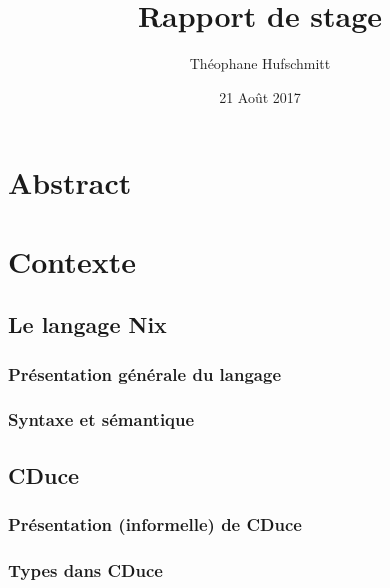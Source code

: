\documentclass[frenchb]{scrartcl}
\title{Rapport de stage}
\author{Théophane Hufschmitt}
\date{21 Août 2017}
\begin{document}
\maketitle

\tableofcontents

\pagebreak

\section*{Abstract}

\section{Contexte}

\subsection{Le langage Nix}

\subsubsection{Présentation générale du langage}

\subsubsection{Syntaxe et sémantique}

\subsection{CDuce}

\subsubsection{Présentation (informelle) de CDuce}

\subsubsection{Types dans CDuce}
\end{document}
